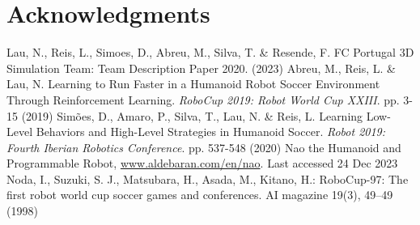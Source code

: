 \documentclass[conference]{IEEEtran}
\begin{document}
\section{Acknowledgments}\label{Acknowledgments}


\begin{thebibliography}{00}
    Lau, N., Reis, L., Simoes, D., Abreu, M., Silva, T. \& Resende, F. FC Portugal 3D Simulation Team: Team Description Paper 2020.  (2023)
    Abreu, M., Reis, L. \& Lau, N. Learning to Run Faster in a Humanoid Robot Soccer Environment Through Reinforcement Learning. {\em RoboCup 2019: Robot World Cup XXIII}. pp. 3-15 (2019)
    Simões, D., Amaro, P., Silva, T., Lau, N. \& Reis, L. Learning Low-Level Behaviors and High-Level Strategies in Humanoid Soccer. {\em Robot 2019: Fourth Iberian Robotics Conference}. pp. 537-548 (2020)
     Nao the Humanoid and Programmable Robot, \href{www.aldebaran.com/en/nao}{www.aldebaran.com/en/nao}. Last accessed 24 Dec 2023
     Noda, I., Suzuki, S. J., Matsubara, H., Asada, M., Kitano, H.: RoboCup-97: The first robot world cup soccer games and conferences. AI magazine 19(3), 49–49 (1998)
\end{thebibliography}
\end{document}
